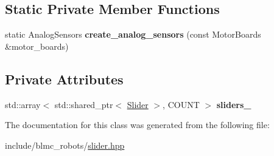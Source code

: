 \subsection*{Static Private Member Functions}
\begin{DoxyCompactItemize}
\item 
static Analog\+Sensors {\bfseries create\+\_\+analog\+\_\+sensors} (const Motor\+Boards \&motor\+\_\+boards)\hypertarget{classblmc__robots_1_1Sliders_a852a682674219e1c95b6005b387ce5d5}{}\label{classblmc__robots_1_1Sliders_a852a682674219e1c95b6005b387ce5d5}

\end{DoxyCompactItemize}
\subsection*{Private Attributes}
\begin{DoxyCompactItemize}
\item 
std\+::array$<$ std\+::shared\+\_\+ptr$<$ \hyperlink{classblmc__robots_1_1Slider}{Slider} $>$, C\+O\+U\+NT $>$ {\bfseries sliders\+\_\+}\hypertarget{classblmc__robots_1_1Sliders_a1ecba536dcd14696e27379a0baed0471}{}\label{classblmc__robots_1_1Sliders_a1ecba536dcd14696e27379a0baed0471}

\end{DoxyCompactItemize}


The documentation for this class was generated from the following file\+:\begin{DoxyCompactItemize}
\item 
include/blmc\+\_\+robots/\hyperlink{slider_8hpp}{slider.\+hpp}\end{DoxyCompactItemize}
